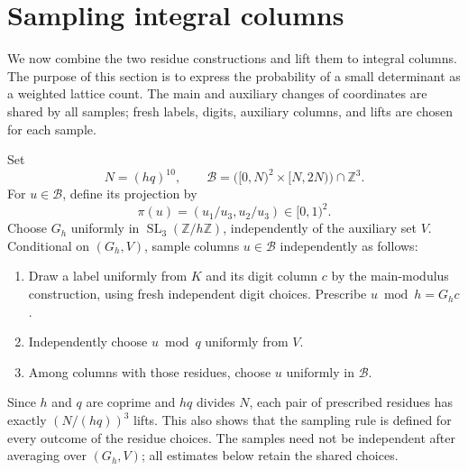 \section{Sampling integral columns}\label{sam:section}

We now combine the two residue constructions and lift them to integral
columns.  The purpose of this section is to express the probability of a
small determinant as a weighted lattice count.  The main and auxiliary
changes of coordinates are shared by all samples; fresh labels, digits,
auxiliary columns, and lifts are chosen for each sample.

Set
\begin{equation}\label{sam:box}
 N=(hq)^{10},\qquad
 \mathcal B=\bigl([0,N)^2\times[N,2N)\bigr)\cap\mathbb Z^3.
\end{equation}
For $u\in\mathcal B$, define its projection by
\[
 \pi(u)=(u_1/u_3,u_2/u_3)\in[0,1)^2.
\]
Choose $G_h$ uniformly in $\operatorname{SL}_3(\mathbb Z/h\mathbb Z)$,
independently of the auxiliary set $V$.  Conditional on $(G_h,V)$, sample
columns $u\in\mathcal B$ independently as follows:
\begin{enumerate}
 \item Draw a label uniformly from $K$ and its digit column $c$ by the
 main-modulus construction, using fresh independent digit choices.
 Prescribe $u\bmod h=G_hc$.
 \item Independently choose $u\bmod q$ uniformly from $V$.
 \item Among columns with those residues, choose $u$ uniformly in
 $\mathcal B$.
\end{enumerate}
Since $h$ and $q$ are coprime and $hq$ divides $N$, each pair of prescribed
residues has exactly $(N/(hq))^3$ lifts.  This also shows that the sampling
rule is defined for every outcome of the residue choices.  The samples
need not be independent after averaging over $(G_h,V)$; all estimates below
retain the shared choices.

